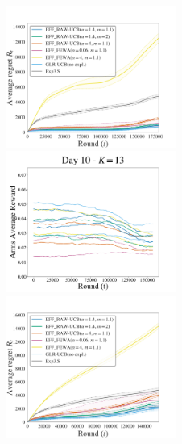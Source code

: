 \begin{figure}[p!]
\includegraphics[clip, width= 0.495\textwidth]{2.2Restless/fig/DAY9.pdf}
\includegraphics[clip, width= 0.495\textwidth]{2.2Restless/fig/reward_plot_day10.pdf}
\includegraphics[clip, width= 0.495\textwidth]{2.2Restless/fig/DAY10.pdf}
\end{figure}
